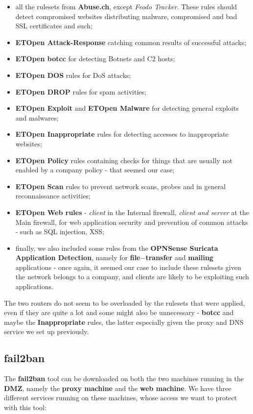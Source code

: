 \begin{itemize}
\item all the rulesets from \textbf{Abuse.ch}, except \textit{Feodo Tracker}. These rules should detect compromised websites distributing malware, compromised and bad SSL certificates and such;
\item \textbf{ETOpen Attack-Response} catching common results of successful attacks;
\item \textbf{ETOpen botcc} for detecting Botnets and C2 hosts;
\item \textbf{ETOpen DOS} rules for DoS attacks;
\item \textbf{ETOpen DROP} rules for spam activities;
\item \textbf{ETOpen Exploit} and \textbf{ETOpen Malware} for detecting general exploits and malwares;
\item \textbf{ETOpen Inappropriate} rules for detecting accesses to inappropriate websites;
\item \textbf{ETOpen Policy} rules containing checks for things that are usually not enabled by a company policy - that seemed our case;
\item \textbf{ETOpen Scan} rules to prevent network scans, probes and in general reconnaissance activities;
\item \textbf{ETOpen Web rules} - \textit{client} in the Internal firewall, \textit{client and server} at the Main firewall, for web application security and prevention of common attacks - such as SQL injection, XSS;
\item finally, we also included some rules from the \textbf{OPNSense Suricata Application Detection}, namely for \textbf{file$-$transfer} and \textbf{mailing} applications - once again, it seemed our case to include these rulesets given the network belongs to a company, and clients are likely to be exploiting such applications.
\end{itemize}

The two routers do not seem to be overloaded by the rulesets that were applied, even if they are quite a lot and some might also be unnecessary - \textbf{botcc} and maybe the \textbf{Inappropriate} rules, the latter especially given the proxy and DNS service we set up previously.\\

\subsection{fail2ban}
The \textbf{fail2ban} tool can be downloaded on both the two machines running in the \textbf{DMZ}, namely the \textbf{proxy machine} and the \textbf{web machine}. We have three different services running on these machines, whose access we want to protect with this tool:

